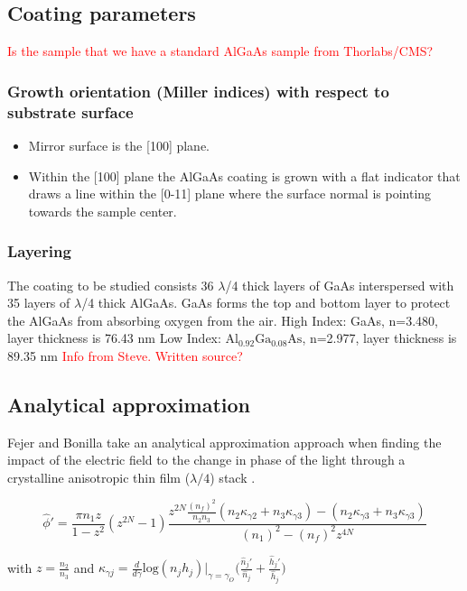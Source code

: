 \subsection{Coating parameters}

\textcolor{red}{Is the sample that we have a standard AlGaAs sample from Thorlabs/CMS?}


\subsubsection{Growth orientation (Miller indices) with respect to substrate surface}
\begin{itemize}
\item Mirror surface is the [100] plane.
\item Within the [100] plane the AlGaAs coating is grown with a flat indicator that draws a line within the [0-11] plane where the surface normal is pointing towards the sample center.
\end{itemize}


\subsubsection{Layering}
The coating to be studied consists 36 $\lambda$/4  thick layers of GaAs interspersed with 35 layers of $\lambda$/4 thick AlGaAs.   GaAs forms the top and bottom layer to protect the AlGaAs from absorbing oxygen from the air.
High Index:  GaAs, n=3.480, layer thickness is 76.43 nm
Low Index:  $ \mathrm{Al}_{0.92} \mathrm{Ga}_{0.08} \mathrm{As} $, n=2.977, layer thickness is 89.35 nm
\textcolor{red}{Info from Steve. Written source?}


\subsection{Analytical approximation}
Fejer and Bonilla take an analytical approximation approach when finding the impact of the electric field to the change in phase of the light through a crystalline anisotropic thin film ($\lambda/4$) stack \cite{bonilla_fejer}.

\begin{equation}
\hat{\phi}' = \frac{\pi n_1 z}{1-z^2}(z^{2N} -1) \frac{z^{2N} \frac{(n_f)^2}{n_2 n_3}(n_2 \kappa_{\gamma 2} + n_3\kappa_{\gamma 3}) - (n_2 \kappa_{\gamma 3} + n_3\kappa_{\gamma 3})}{(n_1)^2 -(n_f)^2 z^{4N}}
\end{equation}

with $z = \frac{n_2}{n_3}$
and
$
\kappa_{\gamma j} = \frac{d}{d \gamma} \mathrm{log}(n_j h_j)|_{\gamma =\gamma_{O}} \bigg(\frac{\hat{n}_j'}{\hat{n}_j} +\frac{\hat{h}_j'}{\hat{h}_j} \bigg)
$

